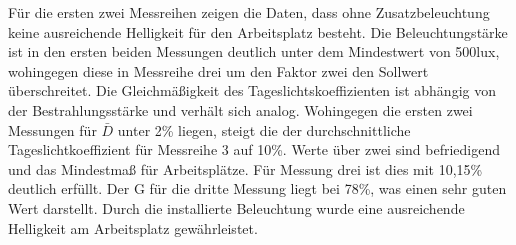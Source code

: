 Für die ersten zwei Messreihen zeigen die Daten, dass ohne Zusatzbeleuchtung keine ausreichende Helligkeit für den Arbeitsplatz besteht. Die Beleuchtungstärke ist in den ersten beiden Messungen deutlich unter dem Mindestwert von 500lux, wohingegen diese in Messreihe drei um den Faktor zwei den Sollwert überschreitet. 
Die Gleichmäßigkeit des Tageslichtskoeffizienten ist abhängig von der Bestrahlungsstärke und verhält sich analog. Wohingegen die ersten zwei Messungen für $\bar D$ unter 2\% liegen, steigt die der durchschnittliche Tageslichtkoeffizient für Messreihe 3 auf 10\%. Werte über zwei sind befriedigend und das Mindestmaß für Arbeitsplätze.
Für Messung drei ist dies mit 10,15\% deutlich erfüllt.
Der G für die dritte Messung liegt bei 78\%, was einen sehr guten Wert darstellt.
Durch die installierte Beleuchtung wurde eine ausreichende Helligkeit am Arbeitsplatz gewährleistet.

